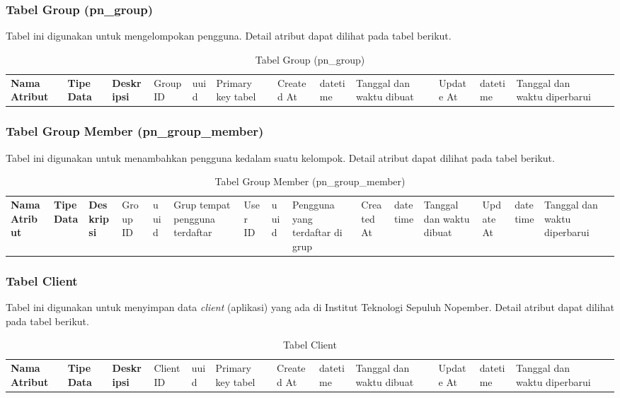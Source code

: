 \subsubsection{Tabel Group (pn\_group)}
\par Tabel ini digunakan untuk mengelompokan pengguna. Detail atribut dapat dilihat pada tabel berikut.
\begin{longtable}{|p{2.5cm}|p{2cm}|p{4.5cm}|}
    \hline
    \textbf{Nama Atribut} & \textbf{Tipe Data} & \textbf{Deskripsi} & \hline
    Group ID & uuid & Primary key tabel & \hline
    Created At & datetime & Tanggal dan waktu dibuat & \hline
    Update At & datetime & Tanggal dan waktu diperbarui & \hline
    \caption{Tabel Group (pn\_group)}
\end{longtable}

\subsubsection{Tabel Group Member (pn\_group\_member)}
\par Tabel ini digunakan untuk menambahkan pengguna kedalam suatu kelompok. Detail atribut dapat dilihat pada tabel berikut.
\begin{longtable}{|p{2.5cm}|p{2cm}|p{4.5cm}|}
    \hline
    \textbf{Nama Atribut} & \textbf{Tipe Data} & \textbf{Deskripsi} & \hline
    Group ID & uuid & Grup tempat pengguna terdaftar & \hline
    User ID & uuid & Pengguna yang terdaftar di grup & \hline
    Created At & datetime & Tanggal dan waktu dibuat & \hline
    Update At & datetime & Tanggal dan waktu diperbarui & \hline
    \caption{Tabel Group Member (pn\_group\_member)}
\end{longtable}

\subsubsection{Tabel Client}
\par Tabel ini digunakan untuk menyimpan data \textit{client} (aplikasi) yang ada di Institut Teknologi Sepuluh Nopember. Detail atribut dapat dilihat pada tabel berikut.
\begin{longtable}{|p{2.5cm}|p{2cm}|p{4.5cm}|}
    \hline
    \textbf{Nama Atribut} & \textbf{Tipe Data} & \textbf{Deskripsi} & \hline
    Client ID & uuid & Primary key tabel & \hline
    Created At & datetime & Tanggal dan waktu dibuat & \hline
    Update At & datetime & Tanggal dan waktu diperbarui & \hline
    \caption{Tabel Client}
\end{longtable}

